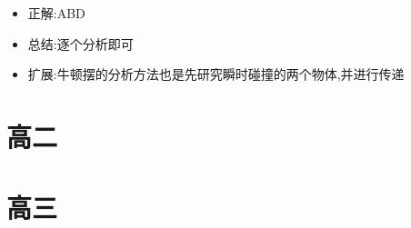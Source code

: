 \documentclass{article}
\begin{document}
        \begin{itemize}
            \item 正解:\quad ABD
            \item 总结:\quad 逐个分析即可
            \item 扩展:\quad 牛顿摆的分析方法也是先研究瞬时碰撞的两个物体,并进行传递
        \end{itemize}


        

        

        
    


    \section{高二}





    \section{高三}
\end{document}
